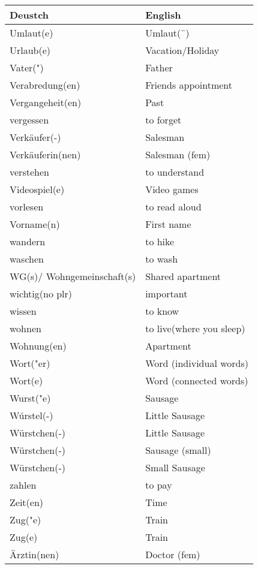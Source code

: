 \documentclass{article}
\renewcommand{\arraystretch}{1}
\begin{document}
\newpage

\begin{minipage}{0.48\textwidth}
    \centering
    \renewcommand{\arraystretch}{1.5}
    \begin{tabular}{|>{\raggedright\arraybackslash}p{3.5cm}|>{\raggedright\arraybackslash}p{3.5cm}|}
        \hline
        \rowcolor{gray!20} \textbf{Deustch} & \textbf{English} \\
        \hline
        Umlaut(e) & Umlaut(¨) \\\hline
        Urlaub(e) & Vacation/Holiday \\\hline
        Vater(") & Father \\\hline
        Verabredung(en) & Friends appointment \\\hline
        Vergangeheit(en) & Past \\\hline
        vergessen & to forget \\\hline
        Verkäufer(-) & Salesman \\\hline
        Verkäuferin(nen) & Salesman (fem) \\\hline
        verstehen & to understand \\\hline
        Videospiel(e) & Video games \\\hline
        vorlesen & to read aloud \\\hline
        Vorname(n) & First name \\\hline
        wandern & to hike \\\hline
        waschen & to wash \\\hline
        WG(s)/ Wohngemeinschaft(s) & Shared apartment \\\hline
        wichtig(no plr) & important \\\hline
        wissen & to know \\\hline
        wohnen & to live(where you sleep) \\\hline
        Wohnung(en) & Apartment \\\hline
        Wort("er) & Word (individual words) \\\hline
        Wort(e) & Word (connected words) \\\hline
        Wurst("e) & Sausage \\\hline
        Wúrstel(-) & Little Sausage \\\hline
        Würstchen(-) & Little Sausage \\\hline
        Würstchen(-) & Sausage (small) \\\hline
        Würstchen(-) & Small Sausage \\\hline
        zahlen & to pay \\\hline
        Zeit(en) & Time \\\hline
        Zug("e) & Train \\\hline
        Zug(e) & Train \\\hline
        Ärztin(nen) & Doctor (fem) \\\hline
    \end{tabular}
\end{minipage}%
\end{document}
